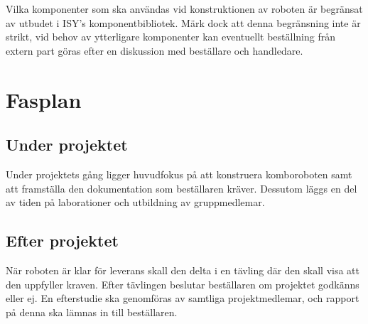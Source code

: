 \documentclass[a4paper,12pt]{article}
\begin{document}
Vilka komponenter som ska användas vid konstruktionen av roboten är begränsat av utbudet i ISY's komponentbibliotek. Märk dock att denna begränsning inte är strikt, vid behov av ytterligare komponenter kan eventuellt beställning från extern part göras efter en diskussion med beställare och handledare. 


\section{Fasplan}		

\subsection{Under projektet}
Under projektets gång ligger huvudfokus på att konstruera komboroboten samt att framställa den dokumentation som beställaren kräver. Dessutom läggs en del av tiden på laborationer och utbildning av gruppmedlemar.
\subsection{Efter projektet}
När roboten är klar för leverans skall den delta i en tävling där den skall visa att den uppfyller kraven. Efter tävlingen beslutar beställaren om projektet godkänns eller ej. En efterstudie ska genomföras av samtliga projektmedlemar, och rapport på denna ska lämnas in till beställaren. 
\end{document}
